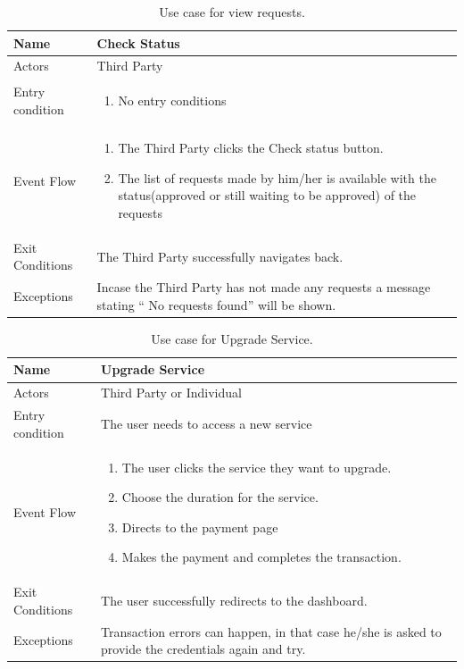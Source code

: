 
\begin{table}[H]
\begin{tabular}{| l | p{} |}
\hline
Name & Check Status\\
\hline
Actors & Third Party\\
\hline
Entry condition & \begin{enumerate}
\item No entry conditions
\end{enumerate}\\
\hline
Event Flow & \begin{enumerate}
\item The Third Party clicks the Check status button.
\item The list of requests made by him/her is available with the status(approved or still waiting to be approved) of the requests
\end{enumerate}\\
\hline
Exit Conditions & The Third Party successfully navigates back.\\
\hline
Exceptions & Incase the Third Party has not made any requests a message stating “ No requests found” will be shown.\\
\hline
\end{tabular}
\caption{Use case for view requests.}
\label{usecase-view-requests}
\end{table}

\begin{table}[H]
\begin{tabular}{| l | p{} |}
\hline
Name & Upgrade Service\\
\hline
Actors & Third Party or Individual\\
\hline
Entry condition & The user needs to access a new service\\
\hline
Event Flow & \begin{enumerate}
\item The user clicks the service they want to upgrade.
\item Choose the duration for the service.
\item Directs to the payment page
\item Makes the payment and completes the transaction.
\end{enumerate}
\\
\hline
Exit Conditions & The user successfully redirects to the dashboard.\\
\hline
Exceptions & Transaction errors can happen, in that case he/she is asked to provide the credentials again and try. \\
\hline
\end{tabular}
\caption{Use case for Upgrade Service.}
\label{usecase-upgradeservice}
\end{table}

